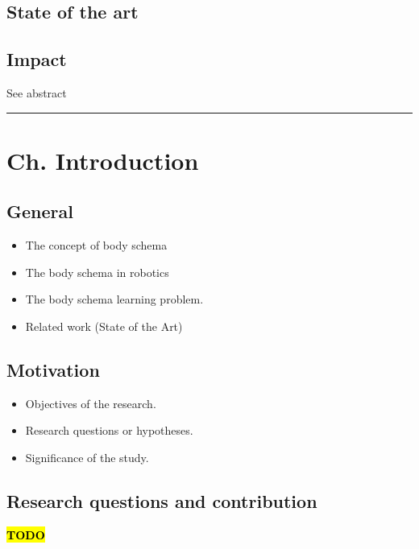 \documentclass[12pt, a4paper]{article}
\newcommand{\TODO}{\hl{\textbf{TODO}}}
\begin{document}
\subsection*{State of the art}

\subsection*{Impact}
See abstract

\rule{\textwidth}{0.4pt}

\section*{Ch. Introduction}

\subsection*{General}
\begin{itemize}
	\item The concept of body schema
	\item The body schema in robotics
	\item The body schema learning problem.
	\item Related work (State of the Art)

\end{itemize}

\subsection*{Motivation}
\begin{itemize}
	\item Objectives of the research.
	\item Research questions or hypotheses.
	\item Significance of the study.
\end{itemize}

\subsection*{Research questions and contribution}
\TODO
\end{document}
